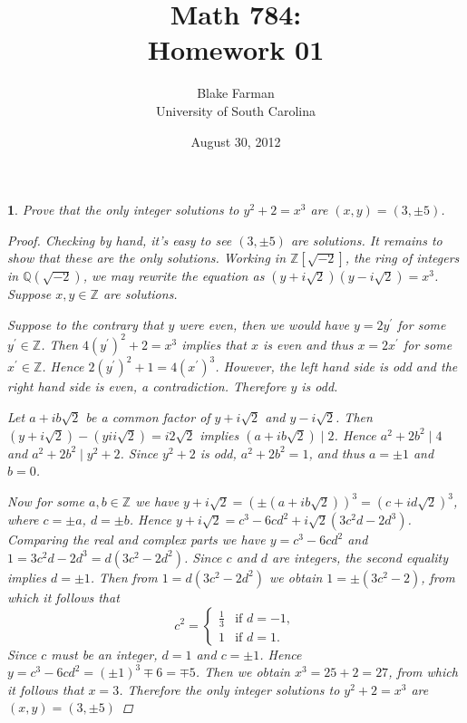 \documentclass[10pt]{amsart}
\author{Blake Farman\\University of South Carolina}
\title{Math 784:\\Homework 01}
\date{August 30, 2012}
\begin{document}
\maketitle

\newtheorem{thm}{}

\begin{thm}
		Prove that the only integer solutions to $y^2 + 2 = x^3$ are $(x,y) = (3,\pm5)$.
		
		\begin{proof}
			Checking by hand, it's easy to see $(3, \pm5)$ are solutions.
			It remains to show that these are the only solutions.
			Working in $\mathbb{Z}[\sqrt{-2}]$, the ring of integers in $\mathbb{Q}(\sqrt{-2})$, we may rewrite the equation as $(y + i\sqrt{2})(y - i\sqrt{2}) = x^3$.
			Suppose $x,y \in \mathbb{Z}$ are solutions.
			
			Suppose to the contrary that $y$ were even, then we would have $y = 2y^\prime$ for some $y^\prime \in \mathbb{Z}$.
			Then $4(y^\prime)^2 + 2 = x^3$ implies that $x$ is even and thus $x = 2x^\prime$ for some $x^\prime \in \mathbb{Z}$.
			Hence $2(y^\prime)^2 + 1 = 4(x^\prime)^3$.
			However, the left hand side is odd and the right hand side is even, a contradiction.
			Therefore $y$ is odd.
			
			Let $a + ib\sqrt{2}$ be a common factor of $y + i\sqrt{2}$ and $y - i\sqrt{2}$.
			Then $(y + i\sqrt{2}) - (y i i\sqrt{2}) = i2\sqrt{2}$ implies $(a + ib\sqrt{2}) \mid 2$.
			Hence $a^2 + 2b^2 \mid 4$ and $a^2 + 2b^2 \mid y^2 + 2$.
			Since $y^2 + 2$ is odd, $a^2 + 2b^2 = 1$, and thus $a = \pm 1$ and $b = 0$.
			
			Now for some $a,b \in \mathbb{Z}$ we have $y + i\sqrt{2} = (\pm(a +ib\sqrt{2}))^3 = (c + id\sqrt{2})^3$, where $c = \pm a$, $d = \pm b$.
			Hence $y + i\sqrt{2} = c^3 - 6cd^2 + i\sqrt{2}(3c^2d - 2d^3)$.
			Comparing the real and complex parts we have $y = c^3 - 6cd^2$ and $1 = 3c^2d - 2d^3 = d(3c^2 - 2d^2)$.
			Since $c$ and $d$ are integers, the second equality implies $d = \pm 1$.
			Then from $1 = d(3c^2 - 2d^2)$ we obtain $1 = \pm(3c^2 - 2)$, from which it follows that 
			$$c^2 = \left\{ 
			\begin{array}{ll}
			\frac{1}{3} & \text{if } d = -1,\\
			1 & \text{if } d = 1.
			\end{array}
			\right.$$
			Since $c$ must be an integer, $d = 1$ and $c = \pm 1$.
			Hence $y = c^3 - 6cd^2 =(\pm 1)^3 \mp 6 = \mp 5$.
			Then we obtain $x^3 = 25 + 2 = 27$, from which it follows that $x = 3$.
			Therefore the only integer solutions to $y^2 + 2 = x^3$ are $(x,y) = (3,\pm 5)$
		\end{proof}
\end{thm}
\end{document}
